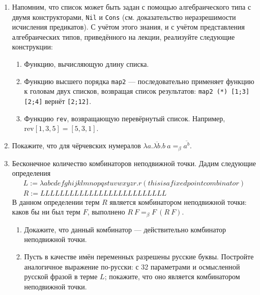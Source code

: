 \documentclass[10pt,a4paper,oneside]{article}
\begin{document}
\begin{enumerate}
С помощью $Y$-комбинатора реализуйте:
\begin{enumerate}
\item Вычисление $k$-го простого числа.
\item Частичный логарифм.
\item Предложите три других комбинатора неподвижной точки (других --- то есть, не бета-экви\-ва\-лент\-ных $Y$ и между собой).
\end{enumerate}

\item Напомним, что список может быть задан с помощью алгебраического типа с двумя конструкторами, \verb!Nil! и \verb!Cons!
(см. доказательство неразрешимости исчисления предикатов). С учётом этого знания, и с учётом представления 
алгебраических типов, приведённого на лекции, реализуйте следующие конструкции:
\begin{enumerate}
\item Функцию, вычисляющую длину списка.
\item Функцию высшего порядка \verb!map2! --- последовательно применяет функцию к головам двух списков, возвращая список результатов:
\verb!map2 (*) [1;3] [2;4]! вернёт \verb![2;12]!.
\item Функцию \verb!rev!, возвращающую перевёрнутый список. Например, $\text{rev}[1,3,5] = [5,3,1]$.
\end{enumerate}


\item Покажите, что для чёрчевских нумералов $\overline{\lambda a.\lambda b.b\ a} =_\beta \overline{a^b}$.

\item Бесконечное количество комбинаторов неподвижной точки. Дадим следующие определения
$$\begin{array}{l}
L := \lambda abcdefghijklmnopqstuvwxyzr.r(thisisafixedpointcombinator)\\
R := LLLLLLLLLLLLLLLLLLLLLLLLLL\end{array}$$
В данном определении терм $R$ является комбинатором неподвижной точки: каков бы ни был терм
$F$, выполнено $R\ F =_\beta F\ (R\ F)$.
\begin{enumerate}
\item Докажите, что данный комбинатор --- действительно комбинатор неподвижной точки.
\item Пусть в качестве имён переменных разрешены русские буквы. Постройте аналогичное выражение
по-русски: с 32 параметрами и осмысленной русской фразой в терме $L$; покажите, что оно является
комбинатором неподвижной точки.
\end{enumerate}


\end{enumerate}
\end{document}
